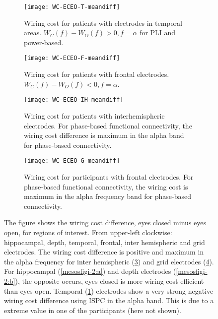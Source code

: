 \documentclass[11pt, onecolumn]{article}
\begin{document}
\begin{figure}[h]
\begin{adjustbox}{minipage=\linewidth,scale=0.9}
  \begin{subfigure}[t]{0.5\linewidth}
    \centering
    \texttt{[image: WC-ECEO-T-meandiff]} 
    \caption{Wiring cost for patients with electrodes in temporal areas.  $W_C(f) - W_O(f) > 0, f = \alpha$ for PLI and power-based.} 
    \label{mesosfigi-2:c} 
  \end{subfigure} 
  \hspace{1ex}
 \begin{subfigure}[t]{0.5\linewidth}
    \centering
    \texttt{[image: WC-ECEO-F-meandiff]} 
    \caption{Wiring cost for patients with frontal electrodes. $W_C(f) - W_O(f) <0, f = \alpha$.} 
    \label{mesosfigi-2:d} 
  \end{subfigure} 
    \begin{subfigure}[t]{0.5\linewidth}
    \centering
    \texttt{[image: WC-ECEO-IH-meandiff]} 
    \caption{Wiring cost for patients with interhemispheric electrodes. For phase-based functional connectivity, the wiring cost difference is maximum in the alpha band for phase-based connectivity.} 
    \label{mesosfigi-2:e} 
  \end{subfigure}%
    \hspace{1ex}
   \begin{subfigure}[t]{0.5\linewidth}
    \centering
    \texttt{[image: WC-ECEO-G-meandiff]} 
    \caption{Wiring cost for participants with frontal electrodes. For phase-based functional connectivity, the wiring cost is maximum in the alpha frequency band for phase-based connectivity.} 
    \label{mesosfigi-2:f} 
  \end{subfigure} 
  \caption{The figure shows the wiring cost difference, eyes closed minus eyes open, for regions of interest. From upper-left clockwise: hippocampal, depth, temporal, frontal, inter hemispheric and grid electrodes. The wiring cost difference is positive and maximum in the alpha frequency for inter hemispheric (\ref{mesosfigi-2:e}) and grid electrodes (\ref{mesosfigi-2:f}). For hippocampal (\ref{mesosfigi-2:a}) and depth electrodes (\ref{mesosfigi-2:b}), the opposite occurs, eyes closed is more wiring cost efficient than eyes open.
Temporal (\ref{mesosfigi-2:c}) electrodes show a very strong negative wiring cost difference using ISPC in the alpha band. This is due to a extreme value in one of the participants (here not shown).}%
  \label{fig:mesosfigi-2} 
  \end{adjustbox}
\end{figure}
\end{document}
